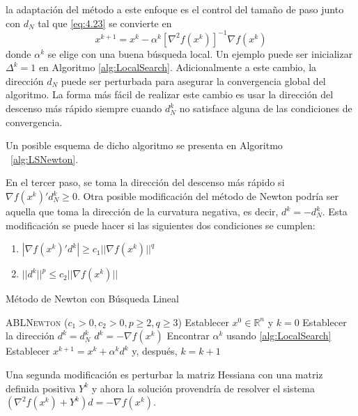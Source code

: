 la adaptación del método a este enfoque es el control del tamaño de paso junto con $d_N$ tal que \ref{eq:4.23} se convierte en
\begin{equation}
x^{k+1} = x^k - \alpha^k[\nabla^2 f(x^k)]^{-1}\nabla f(x^k)
\label{eq:4.24}
\end{equation}
donde $\alpha^k$ se elige con una buena búsqueda local. 
Un ejemplo puede ser inicializar $\Delta^k = 1$ en Algoritmo \ref{alg:LocalSearch}. 
Adicionalmente a este cambio, la dirección $d_N$ puede ser perturbada para asegurar la convergencia global del algoritmo. 
La forma más fácil de realizar este cambio es usar la dirección del descenso más rápido siempre cuando $d^k_N$ no satisface alguna de las condiciones de convergencia. 

Un posible esquema de dicho algoritmo se presenta en Algoritmo ~\ref{alg:LSNewton}.

En el tercer paso, se toma la dirección del descenso más rápido si $\nabla f(x^k)'d^k_N\geq 0$. 
Otra posible modificación del método de Newton podría ser aquella que toma la dirección de la curvatura negativa, es decir, $d^k = -d_N^k$. 
Esta modificación se puede hacer si las siguientes dos condiciones se cumplen:
\begin{enumerate}
	\item $|\nabla f(x^k)'d^k| \geq c_1||\nabla f(x^k)||^q$
	\item $||d^k||^p \leq c_2 ||\nabla f(x^k)||$
\end{enumerate}

\begin{algorithm}[H]
\caption{Método de Newton con Búsqueda Lineal}\label{alg:LSNewton}
\begin{algorithmic}[1]
\Procedure \textsc{ABLNewton} ($c_1>0,c_2>0,p\geq 2, q\geq 3$)
\State Establecer $x^0\in\mathbb{R}^n$ y $k=0$
		\State Establecer la dirección $d^k = d_N^k$
	\Else
		\State $d^k = -\nabla f(x^k)$
	\EndIf
	\State Encontrar $\alpha^k$ usando \ref{alg:LocalSearch}
	\State Establecer $x^{k+1} = x^k+\alpha^kd^k$ y, después, $k=k+1$
\EndWhile
\EndProcedure
\end{algorithmic}
\end{algorithm}

Una segunda modificación es perturbar la matriz Hessiana con una matriz definida positiva $Y^k$ y ahora la solución provendría de resolver el sistema $(\nabla^2 f(x^k) + Y^k)d = -\nabla f(x^k)$.

